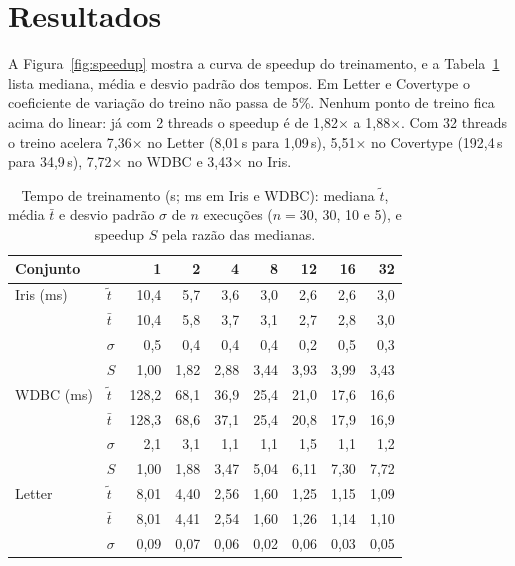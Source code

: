 \documentclass[12pt]{article}
\begin{document}
\section{Resultados}

A Figura~\ref{fig:speedup} mostra a curva de speedup do treinamento, e a
Tabela~\ref{tab:treino} lista mediana, média e desvio padrão dos tempos. Em Letter e
Covertype o coeficiente de variação do treino não passa de 5\%. Nenhum ponto de treino fica acima do linear: já com 2
threads o speedup é de 1{,}82$\times$ a 1{,}88$\times$. Com 32 threads o treino
acelera 7{,}36$\times$ no Letter (8{,}01\,s para 1{,}09\,s), 5{,}51$\times$ no
Covertype (192{,}4\,s para 34{,}9\,s), 7{,}72$\times$ no WDBC e 3{,}43$\times$ no Iris.

\begin{table}[!htbp]
\centering
\caption{Tempo de treinamento (s; ms em Iris e WDBC): mediana $\tilde{t}$, média
$\bar{t}$ e desvio padrão $\sigma$ de $n$ execuções ($n = 30$, 30, 10 e 5), e speedup $S$
pela razão das medianas.}
\label{tab:treino}
\footnotesize
\setlength{\tabcolsep}{4.2pt}
\begin{tabular}{@{}llrrrrrrr@{}}
\toprule
Conjunto & & 1 & 2 & 4 & 8 & 12 & 16 & 32 \\
\midrule
Iris (ms) & $\tilde{t}$ & 10{,}4 & 5{,}7 & 3{,}6 & 3{,}0 & 2{,}6 & 2{,}6 & 3{,}0 \\
       & $\bar{t}$ & 10{,}4 & 5{,}8 & 3{,}7 & 3{,}1 & 2{,}7 & 2{,}8 & 3{,}0 \\
       & $\sigma$ & 0{,}5 & 0{,}4 & 0{,}4 & 0{,}4 & 0{,}2 & 0{,}5 & 0{,}3 \\
       & $S$ & 1{,}00 & 1{,}82 & 2{,}88 & 3{,}44 & 3{,}93 & 3{,}99 & 3{,}43 \\
\addlinespace
WDBC (ms) & $\tilde{t}$ & 128{,}2 & 68{,}1 & 36{,}9 & 25{,}4 & 21{,}0 & 17{,}6 & 16{,}6 \\
       & $\bar{t}$ & 128{,}3 & 68{,}6 & 37{,}1 & 25{,}4 & 20{,}8 & 17{,}9 & 16{,}9 \\
       & $\sigma$ & 2{,}1 & 3{,}1 & 1{,}1 & 1{,}1 & 1{,}5 & 1{,}1 & 1{,}2 \\
       & $S$ & 1{,}00 & 1{,}88 & 3{,}47 & 5{,}04 & 6{,}11 & 7{,}30 & 7{,}72 \\
\addlinespace
Letter & $\tilde{t}$ & 8{,}01 & 4{,}40 & 2{,}56 & 1{,}60 & 1{,}25 & 1{,}15 & 1{,}09 \\
       & $\bar{t}$ & 8{,}01 & 4{,}41 & 2{,}54 & 1{,}60 & 1{,}26 & 1{,}14 & 1{,}10 \\
       & $\sigma$ & 0{,}09 & 0{,}07 & 0{,}06 & 0{,}02 & 0{,}06 & 0{,}03 & 0{,}05 \\

\end{tabular}
\end{table}
\end{document}
